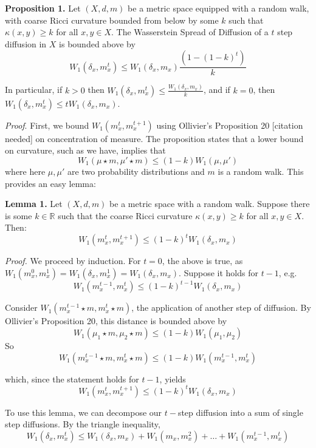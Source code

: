 \documentclass[
  letterpaper,
  DIV=11,
  numbers=noendperiod]{scrartcl}
\begin{document}
\textbf{Proposition 1.} Let \((X,d,m)\) be a metric space equipped with
a random walk, with coarse Ricci curvature bounded from below by some
\(k\) such that \(\kappa(x,y) \geq k\) for all \(x,y \in X\). The
Wasserstein Spread of Diffusion of a \(t\) step diffusion in \(X\) is
bounded above by \[
W_{1}(\delta_{x}, m_{x}^t) \leq W_1\left(\delta_x,m_x\right)\frac{(1-(1-k)^t)}{k}
\]

In particular, if \(k>0\) then
\(W_{1}(\delta_{x},m_{x}^t) \leq \frac{W_1\left(\delta_x,m_x\right)}{k}\),
and if \(k=0\), then
\(W_{1}(\delta_{x},m_{x}^t) \leq tW_1\left(\delta_x,m_x\right)\).

\emph{Proof}. First, we bound \(W_{1}(m_{x}^t,m_{x}^{t+1})\) using
Ollivier's Proposition 20 {[}citation needed{]} on concentration of
measure. The proposition states that a lower bound on curvature, such as
we have, implies that \[
W_{1}(\mu \star m, \mu' \star m) \leq (1-k)W_{1}(\mu, \mu')
\] where here \(\mu,\mu'\) are two probability distributions and \(m\)
is a random walk. This provides an easy lemma:

\textbf{Lemma 1.} Let \((X,d,m)\) be a metric space with a random walk.
Suppose there is some \(k \in \mathbb{R}\) such that the coarse Ricci
curvature \(\kappa(x,y) \geq k\) for all \(x,y \in X\). Then: \[
W_1\left(m_x^t, m_x^{t+1}\right) \leq(1-k)^t W_1\left(\delta_x,m_x\right)
\]

\emph{Proof.} We proceed by induction. For \(t=0\), the above is true,
as
\(W_{1}(m_{x}^0, m_{x}^{1}) =W_{1}(\delta_x, m_{x}^{1}) = W_1\left(\delta_x,m_x\right)\).
Suppose it holds for \(t-1\), e.g. \[
W_1\left(m_x^{t-1}, m_x^{t}\right) \leq(1-k)^{t-1} W_1\left(\delta_x,m_x\right)
\]

Consider \(W_1\left(m_x^{t-1}\star m, m_x^{t}\star m\right)\), the
application of another step of diffusion. By Ollivier's Proposition 20,
this distance is bounded above by \[
W_1\left(\mu_1 \star m, \mu_2 \star m\right) \leq(1-k) W_1\left(\mu_1, \mu_2\right)
\] So \[
W_1\left(m_x^{t-1}\star m, m_x^{t}\star m\right) \leq  (1-k)W_1\left(m_x^{t-1}, m_x^{t}\right)
\]

which, since the statement holds for \(t-1\), yields \[
W_1\left(m_x^t, m_x^{t+1}\right) \leq(1-k)^t W_1\left(\delta_x,m_x\right)
\]

To use this lemma, we can decompose our \(t-\)step diffusion into a sum
of single step diffusions. By the triangle inequality, \[
W_{1}(\delta_{x},m_{x}^t) \leq W_1\left(\delta_x,m_x\right) + W_{1}(m_{x},m_{x}^2) + \dots + W_{1}(m_{x}^{t-1}, m_{x}^t)
\]
\end{document}
